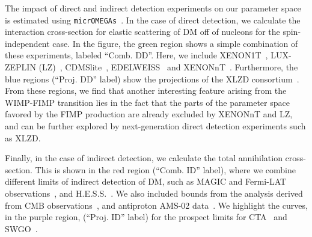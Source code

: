 \documentclass[a4paper,11pt]{article}
\begin{document}
The impact of direct and indirect detection experiments on our parameter space is estimated using \texttt{micrOMEGAs}~\cite{Belanger:2020gnr}. In the case of direct detection, we calculate the interaction cross-section for elastic scattering of DM off of nucleons for the spin-independent case. In the figure, the green region shows a simple combination of these experiments, labeled ``Comb. DD''. Here, we include XENON1T~\cite{XENON:2018voc}, LUX-ZEPLIN (LZ)~\cite{LZ:2022lsv}, CDMSlite~\cite{SuperCDMS:2015eex}, EDELWEISS~\cite{Lattaud:2022jnq} and XENONnT~\cite{XENON:2023cxc}. Furthermore, the blue regions (``Proj. DD'' label) show the projections of the XLZD consortium~\cite{Aalbers:2022dzr}.
From these regions, we find that another interesting feature arising from the WIMP-FIMP transition lies in the fact that the parts of the parameter space favored by the FIMP production are already excluded by XENONnT and LZ, and can be further explored by next-generation direct detection experiments such as XLZD.

Finally, in the case of indirect detection, we calculate the total annihilation cross-section. This is shown in the red region (``Comb. ID'' label), where we combine different limits of indirect detection of DM, such as MAGIC and Fermi-LAT observations~\cite{MAGIC:2016xys}, and H.E.S.S.~\cite{HESS:2022ygk}. We also included bounds from the analysis derived from CMB observations~\cite{Kawasaki:2021etm}, and antiproton AMS-02 data~\cite{Cui:2018klo}. We highlight the curves, in the purple region, (``Proj. ID'' label) for the prospect limits for CTA~\cite{CTAConsortium:2017dvg} and SWGO~\cite{Viana:2021smp}. 
\end{document}

